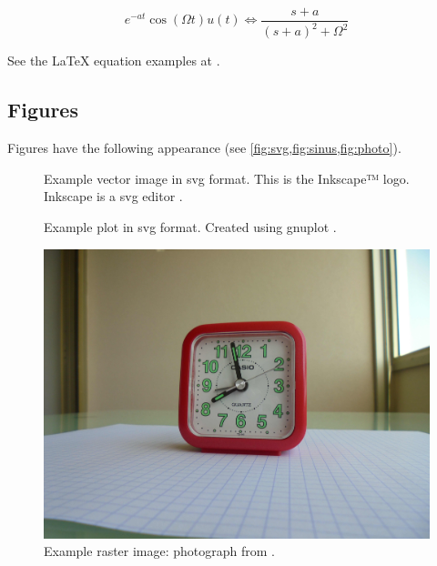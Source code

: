 \begin{equation} \label{eq:example3}
e^{ - at} \cos (\Omega t)u(t) \Leftrightarrow
\frac{{s + a}}{{(s + a)^2  + \Omega ^2 }}
\end{equation}

See the LaTeX equation examples at \cite{equationsheet,SO-latex-equations}.

\subsection{Figures}
Figures have the following appearance (see \cref{fig:svg,fig:sinus,fig:photo}).

\begin{figure}

\caption{\label{fig:svg} Example vector image in svg format. This is the
Inkscape™ logo. Inkscape is a \gls{svg} editor \cite{inkscape}.}
\end{figure}

\begin{figure}

\caption{\label{fig:sinus} Example plot in svg format. Created using gnuplot
\cite{gnuplot}.}
\end{figure}

\begin{figure}
\includegraphics[width=\textwidth]{images/photo-alarm-clock.jpg}
\caption{\label{fig:photo} Example raster image: photograph from
\cite{thomashoullier/alarm-clock}.}
\end{figure}

